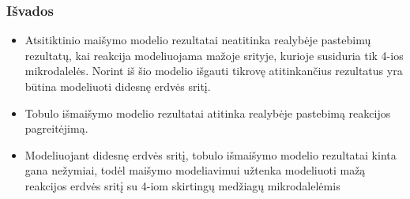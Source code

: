 \documentclass{beamer}
\begin{document}

\begin{frame}
\frametitle{Išvados}
\begin{itemize}
    \item Atsitiktinio maišymo modelio rezultatai neatitinka realybėje pastebimų rezultatų, kai reakcija modeliuojama mažoje srityje, kurioje susiduria tik 4-ios mikrodalelės. Norint iš šio modelio išgauti tikrovę atitinkančius rezultatus yra būtina modeliuoti didesnę erdvės sritį.

    \item Tobulo išmaišymo modelio rezultatai atitinka realybėje pastebimą reakcijos pagreitėjimą.
    
    \item Modeliuojant didesnę erdvės sritį, tobulo išmaišymo modelio rezultatai kinta gana nežymiai, todėl maišymo modeliavimui užtenka modeliuoti mažą reakcijos erdvės sritį su 4-iom skirtingų medžiagų mikrodalelėmis

\end{itemize}
\end{frame}

\end{document}
